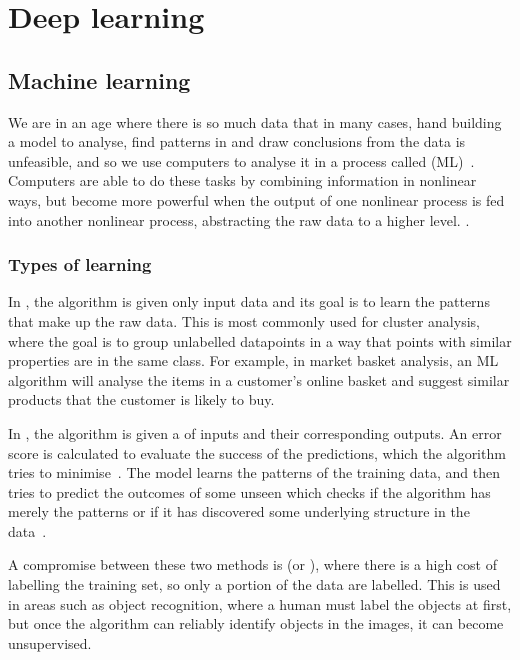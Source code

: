 
\section{Deep learning}

\subsection{Machine learning}

We are in an age where there is so much data that in many cases, hand building a model to analyse, find patterns in and draw conclusions from the data is unfeasible, and so we use computers to analyse it in a process called  (ML)~\autocite[1]{murphy2012}.
Computers are able to do these tasks by combining information in nonlinear ways, but become more powerful when the output of one nonlinear process is fed into another nonlinear process, abstracting the raw data to a higher level.
.

\subsubsection{Types of learning}

In , the algorithm is given only input data and its goal is to learn the patterns that make up the raw data.
This is most commonly used for cluster analysis, where the goal is to group unlabelled datapoints in a way that points with similar properties are in the same class.
For example, in market basket analysis, an ML algorithm will analyse the items in a customer's online basket and suggest similar products that the customer is likely to buy.

In , the algorithm is given a  of inputs and their corresponding outputs.
An error score is calculated to evaluate the success of the predictions, which the algorithm tries to minimise~\autocite[436]{lecun2015}.
The model learns the patterns of the training data, and then tries to predict the outcomes of some unseen  which checks if the algorithm has merely  the patterns or if it has discovered some underlying structure in the data~\autocite[463--467]{lecun2015}.

A compromise between these two methods is  (or ), where there is a high cost of labelling the training set, so only a portion of the data are labelled.
This is used in areas such as object recognition, where a human must label the objects at first, but once the algorithm can reliably identify objects in the images, it can become unsupervised.


